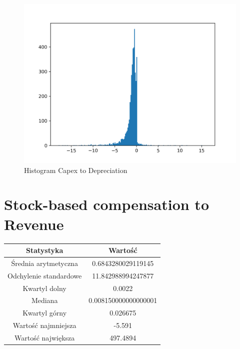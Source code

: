 \documentclass{article}
\begin{document}
\begin{figure}[h!]
    \includegraphics[width=\linewidth]{variables/Capex to Depreciation.png}
    \caption{Histogram Capex to Depreciation }
\end{figure}\section{ Stock-based compensation to Revenue }

\begin{center}
    \begin{tabular}{|c | c|} 
    \hline
    Statystyka & Wartość \\
    \hline\hline
    Średnia arytmetyczna & 0.6843280029119145 \\ 
    \hline
    Odchylenie standardowe & 11.842988994247877 \\
    \hline
    Kwartyl dolny & 0.0022 \\
    \hline
    Mediana & 0.008150000000000001 \\
    \hline
    Kwartyl górny & 0.026675 \\
    \hline
    Wartość najmniejsza & -5.591 \\
    \hline
    Wartość największa & 497.4894 \\
    \hline
   \end{tabular}
\end{center}
\end{document}
